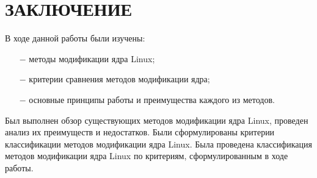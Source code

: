 \chapter*{ЗАКЛЮЧЕНИЕ}

В ходе данной работы были изучены:
\begin{itemize}
    \item[$-$] методы модификации ядра Linux;
    \item[$-$] критерии сравнения методов модификации ядра;
    \item[$-$] основные принципы работы и преимущества каждого из методов.
\end{itemize}
Был выполнен обзор существующих методов модификации ядра Linux, проведен анализ их преимуществ и недостатков.
Были сформулированы критерии классификации методов модификации ядра Linux.
Была проведена классификация методов модификации ядра Linux по критериям, сформулированным в ходе работы.